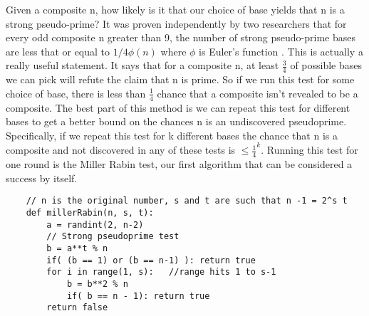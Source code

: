 \documentclass{article}
\begin{document}
Given a composite n, how likely is it that our choice of base yields that n is a strong pseudo-prime?  It was proven independently by two researchers that for every odd composite n greater than 9, the number of strong pseudo-prime bases are less that or equal to $ 1/4 \phi(n)$ where $\phi$ is Euler's function\cite{monier1980evaluation} \cite{rabin1980probabilistic}.
This is actually a really useful statement. It says that for a composite n, at least $\frac{3}{4}$ of possible bases we can pick will refute the claim that n is prime. So if we run this test for some choice of base, there is less than $\frac{1}{4}$ chance that a composite isn't revealed to be a composite.  The best part of this method is we can repeat this test for different bases to get a better bound on the chances n is an undiscovered pseudoprime. Specifically, if we repeat this test for k different bases the chance that n is a composite and not discovered in any of these tests is $\leq \frac{1}{4}^k$. Running this test for one round is the Miller Rabin test, our first algorithm that can be considered a success by itself. 
\begin{verbatim}
    // n is the original number, s and t are such that n -1 = 2^s t
    def millerRabin(n, s, t):
        a = randint(2, n-2)
        // Strong pseudoprime test
        b = a**t % n
        if( (b == 1) or (b == n-1) ): return true
        for i in range(1, s):   //range hits 1 to s-1
            b = b**2 % n
            if( b == n - 1): return true
        return false
\end{verbatim}
\end{document}
